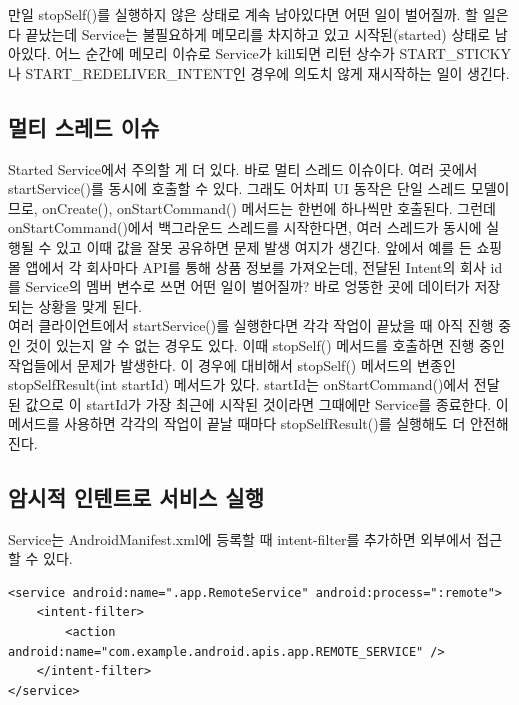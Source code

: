 만일 stopSelf()를 실행하지 않은 상태로 계속 남아있다면 어떤 일이 벌어질까. 할 일은 다 끝났는데 Service는 불필요하게 메모리를 차지하고 있고 시작된(started) 상태로 남아있다. 
어느 순간에 메모리 이슈로 Service가 kill되면 리턴 상수가 START\_STICKY나 START\_REDELIVER\_INTENT인 경우에 의도치 않게 재시작하는 일이 생긴다.

\subsection{멀티 스레드 이슈}
Started Service에서 주의할 게 더 있다. 바로 멀티 스레드 이슈이다. 여러 곳에서 startService()를 동시에 호출할 수 있다. 
그래도 어차피 UI 동작은 단일 스레드 모델이므로, onCreate(), onStartCommand() 메서드는 한번에 하나씩만 호출된다.
그런데 onStartCommand()에서 백그라운드 스레드를 시작한다면, 여러 스레드가 동시에 실행될 수 있고 이때 값을 잘못 공유하면 문제 발생 여지가 생긴다. 앞에서 예를 든 쇼핑몰 앱에서 각 회사마다 API를 통해 상품 정보를 가져오는데, 전달된 Intent의 회사 id를 Service의 멤버 변수로 쓰면 어떤 일이 벌어질까? 바로 엉뚱한 곳에 데이터가 저장되는 상황을 맞게 된다.\\

여러 클라이언트에서 startService()를 실행한다면 각각 작업이 끝났을 때 아직 진행 중인 것이 있는지 알 수 없는 경우도 있다. 이때 stopSelf() 메서드를 호출하면 진행 중인 작업들에서 문제가 발생한다. 
이 경우에 대비해서 stopSelf() 메서드의 변종인 stopSelfResult(int startId) 메서드가 있다.  startId는 onStartCommand()에서 전달된 값으로 이 startId가 가장 최근에 시작된 것이라면 그때에만 Service를 종료한다. 이 메서드를 사용하면 각각의 작업이 끝날 때마다 stopSelfResult()를 실행해도 더 안전해진다.

\subsection{암시적 인텐트로 서비스 실행}
Service는 AndroidManifest.xml에 등록할 때 intent-filter를 추가하면 외부에서 접근할 수 있다.
\begin{lstlisting}[frame=single]
<service android:name=".app.RemoteService" android:process=":remote">
	<intent-filter>
		<action android:name="com.example.android.apis.app.REMOTE_SERVICE" />
	</intent-filter>
</service>
\end{lstlisting}


